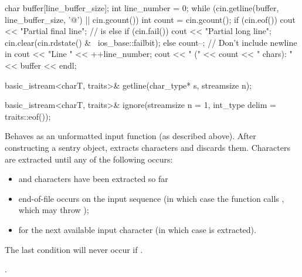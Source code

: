 \begin{itemdescr}
\begin{example}
\begin{codeblock}
{  char buffer[line_buffer_size];
  int line_number = 0;
  while (cin.getline(buffer, line_buffer_size, '@\textbackslash@n') || cin.gcount()) {
    int count = cin.gcount();
    if (cin.eof())
      cout << "Partial final line";   //  is 
    else if (cin.fail()) {
      cout << "Partial long line";
      cin.clear(cin.rdstate() & ~ios_base::failbit);
    } else {
      count--;                        // Don't include newline in 
      cout << "Line " << ++line_number;
    }
    cout << " (" << count << " chars): " << buffer << endl;
  }
}
\end{codeblock}
\end{example}
\end{itemdescr}

%
\begin{itemdecl}
basic_istream<charT, traits>& getline(char_type* s, streamsize n);
\end{itemdecl}

\begin{itemdescr}
\pnum
\returns
{}
\end{itemdescr}

%
\begin{itemdecl}
basic_istream<charT, traits>& ignore(streamsize n = 1, int_type delim = traits::eof());
\end{itemdecl}

\begin{itemdescr}
\pnum
\effects
Behaves as an unformatted input function
(as described above).
After constructing a sentry object, extracts
characters and discards them.
Characters are extracted until any of the following occurs:
\begin{itemize}
\item
{}
and
 characters have been extracted so far
\item
end-of-file occurs on the input sequence
(in which case the function calls
,
which may throw
);
\item
{}
for the next available input character 
(in which case  is extracted).
\end{itemize}

\pnum
\remarks
The last condition will never occur if
.

\pnum
\returns
{}.
\end{itemdescr}

